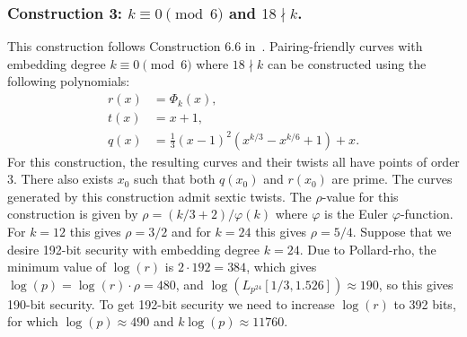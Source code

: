 
\subsubsection{Construction 3: $k \equiv 0 \pmod{6}$ and $18 \nmid k$.}
\label{con3}

This construction follows {Construction 6.6} in~\cite{2010/freeman}.
Pairing-friendly curves with embedding degree $k \equiv 0 \pmod{6}$ where $18 \nmid k$
can be constructed using the following polynomials:
\begin{align*}
r(x) &= \Phi_k(x),	\\
t(x) &= x+1,		\\
q(x) &= \frac{1}{3} (x-1)^2 (x^{k/3} - x^{k/6} + 1) + x.
\end{align*}
For this construction,
the resulting curves and their twists all have points of order 3.
There also exists $x_0$ such that both $q(x_0)$ and $r(x_0)$ are prime.
The curves generated by this construction admit sextic twists.
The $\rho$-value for this construction is given by $\rho = (k/3+2)/\varphi(k)$
where $\varphi$ is the Euler $\varphi$-function.
For $k=12$ this gives $\rho = 3/2$ and for $k=24$ this gives $\rho = 5/4$.
Suppose that we desire 192-bit security with embedding degree $k=24$.
Due to Pollard-rho, the minimum value of $\log(r)$ is $2\cdot 192 = 384$, 
which gives $\log(p) = \log(r) \cdot \rho = 480$,
and
$\log(L_{p^{24}}[1/3, 1.526]) \approx 190$,
so this gives 190-bit security.
To get 192-bit security we need to increase $\log(r)$ to 392 bits, for which
$\log(p) \approx 490$ and $k\log(p) \approx 11760$.


